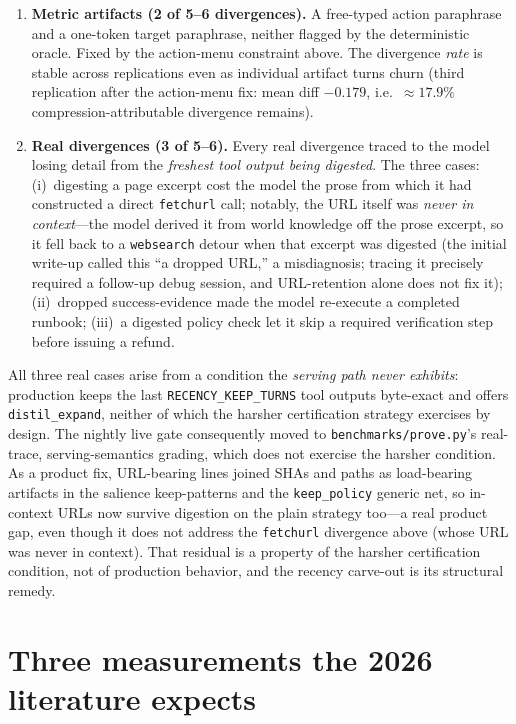 \documentclass[11pt]{article}
\begin{document}
\begin{enumerate}
  \item \textbf{Metric artifacts (2 of 5--6 divergences).} A free-typed action paraphrase and
    a one-token target paraphrase, neither flagged by the deterministic oracle. Fixed by the
    action-menu constraint above. The divergence \emph{rate} is stable across replications
    even as individual artifact turns churn (third replication after the action-menu fix:
    mean diff $-0.179$, i.e.\ $\approx17.9\%$ compression-attributable divergence
    remains).

  \item \textbf{Real divergences (3 of 5--6).} Every real divergence traced to the model
    losing detail from the \emph{freshest tool output being digested}. The three cases:
    (i)~digesting a page excerpt cost the model the prose from which it had constructed a
    direct \texttt{fetchurl} call; notably, the URL itself was \emph{never in context}---the
    model derived it from world knowledge off the prose excerpt, so it fell back to a
    \texttt{websearch} detour when that excerpt was digested (the initial write-up called
    this ``a dropped URL,'' a misdiagnosis; tracing it precisely required a follow-up debug
    session, and URL-retention alone does not fix it); (ii)~dropped success-evidence made the
    model re-execute a completed runbook; (iii)~a digested policy check let it skip a
    required verification step before issuing a refund.
\end{enumerate}

All three real cases arise from a condition the \emph{serving path never exhibits}: production
keeps the last \texttt{RECENCY\_KEEP\_TURNS} tool outputs byte-exact and offers
\texttt{distil\_expand}, neither of which the harsher certification strategy exercises by
design. The nightly live gate consequently moved to \texttt{benchmarks/prove.py}'s real-trace,
serving-semantics grading, which does not exercise the harsher condition. As a product fix,
URL-bearing lines joined SHAs and paths as load-bearing artifacts in the salience
keep-patterns and the \texttt{keep\_policy} generic net, so in-context URLs now survive
digestion on the plain strategy too---a real product gap, even though it does not address the
\texttt{fetchurl} divergence above (whose URL was never in context). That residual is a
property of the harsher certification condition, not of production behavior, and the recency
carve-out is its structural remedy.

\section{Three measurements the 2026 literature expects}
\label{sec:todo}
\end{document}
